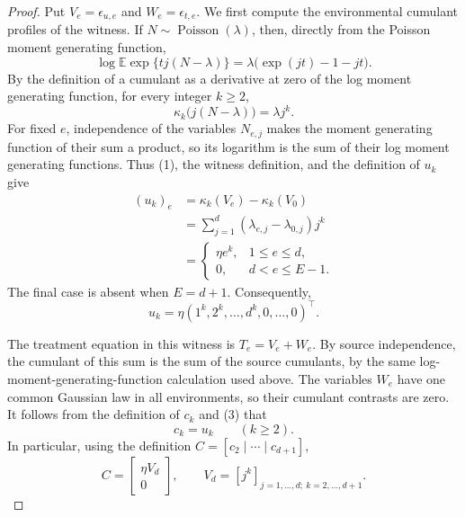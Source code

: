 \documentclass{article}
\begin{document}
\begin{proof}
Put \(V_e=\epsilon_{u,e}\) and \(W_e=\epsilon_{t,e}\).  We first compute the environmental cumulant profiles of the witness.  If \(N\sim\operatorname{Poisson}(\lambda)\), then, directly from the Poisson moment generating function,
\[
 \log \mathbb E\exp\{t j(N-\lambda)\}
 =\lambda\bigl(\exp(jt)-1-jt\bigr).
\]
By the definition of a cumulant as a derivative at zero of the log moment generating function, for every integer \(k\geq2\),
\[
 \kappa_k\bigl(j(N-\lambda)\bigr)=\lambda j^k.                 \tag{1}
\]
For fixed \(e\), independence of the variables \(N_{e,j}\) makes the moment generating function of their sum a product, so its logarithm is the sum of their log moment generating functions.  Thus (1), the witness definition, and the definition of \(u_k\) give
\[
 \begin{aligned}
 (u_k)_e
 &=\kappa_k(V_e)-\kappa_k(V_0)\\
 &=\sum_{j=1}^d(\lambda_{e,j}-\lambda_{0,j})j^k\\
 &=\begin{cases}
      \eta e^k,&1\leq e\leq d,\\
      0,&d<e\leq E-1.
    \end{cases}
 \end{aligned}                                                   \tag{2}
\]
The final case is absent when \(E=d+1\).  Consequently,
\[
 u_k=\eta(1^k,2^k,\ldots,d^k,0,\ldots,0)^\top.                 \tag{3}
\]

The treatment equation in this witness is \(T_e=V_e+W_e\).  By source independence, the cumulant of this sum is the sum of the source cumulants, by the same log-moment-generating-function calculation used above.  The variables \(W_e\) have one common Gaussian law in all environments, so their cumulant contrasts are zero.  It follows from the definition of \(c_k\) and (3) that
\[
 c_k=u_k\qquad(k\geq2).                                         \tag{4}
\]
In particular, using the definition \(C=[c_2\mid\cdots\mid c_{d+1}]\),
\[
 C=\begin{bmatrix}\eta V_d\\[2pt]0\end{bmatrix},
 \qquad
 V_d=[j^k]_{j=1,\ldots,d;\ k=2,\ldots,d+1}.                    \tag{5}
\]


\end{proof}
\end{document}
